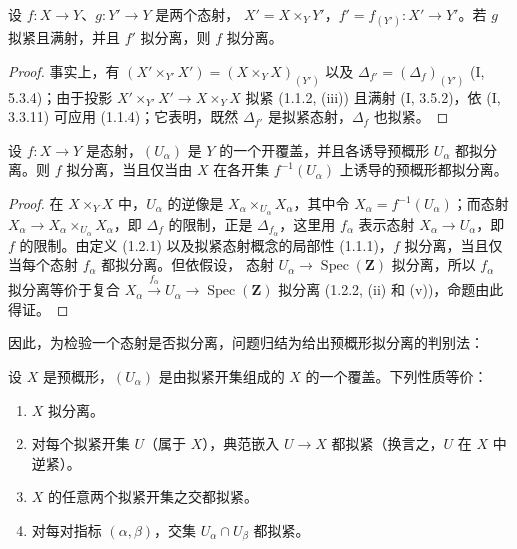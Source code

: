 \begin{proposition}[1.2.5]
\label{IV.1.2.5-fr}
设 $f:X\to Y$、$g:Y'\to Y$ 是两个态射，
$X'=X\times_Y Y'$，$f'=f_{(Y')}:X'\to Y'$。若 $g$ 拟紧且满射，并且
$f'$ 拟分离，则 $f$ 拟分离。
\end{proposition}

\begin{proof}
事实上，有 $(X'\times_{Y'}X')=(X\times_YX)_{(Y')}$ 以及
$\Delta_{f'}=(\Delta_f)_{(Y')}$ (I, 5.3.4)；由于投影
$X'\times_{Y'}X'\to X\times_YX$ 拟紧 (1.1.2, (iii)) 且满射
(I, 3.5.2)，依 (I, 3.3.11) 可应用 (1.1.4)；它表明，既然
$\Delta_{f'}$ 是拟紧态射，$\Delta_f$ 也拟紧。
\end{proof}

\begin{proposition}[1.2.6]
\label{IV.1.2.6-fr}
设 $f:X\to Y$ 是态射，$(U_\alpha)$ 是 $Y$ 的一个开覆盖，并且各诱导预概形
$U_\alpha$ 都拟分离。则 $f$ 拟分离，当且仅当由 $X$ 在各开集
$f^{-1}(U_\alpha)$ 上诱导的预概形都拟分离。
\end{proposition}

\begin{proof}
在 $X\times_YX$ 中，$U_\alpha$ 的逆像是
$X_\alpha\times_{U_\alpha}X_\alpha$，其中令
$X_\alpha=f^{-1}(U_\alpha)$；而态射
$X_\alpha\to X_\alpha\times_{U_\alpha}X_\alpha$，即 $\Delta_f$ 的限制，正是
$\Delta_{f_\alpha}$，这里用 $f_\alpha$ 表示态射
$X_\alpha\to U_\alpha$，即 $f$ 的限制。由定义 (1.2.1) 以及拟紧态射概念的局部性
(1.1.1)，$f$ 拟分离，当且仅当每个态射 $f_\alpha$ 都拟分离。但依假设，
态射 $U_\alpha\to\operatorname{Spec}(\mathbf Z)$ 拟分离，所以
$f_\alpha$ 拟分离等价于复合
$X_\alpha\xrightarrow{f_\alpha}U_\alpha\to\operatorname{Spec}(\mathbf Z)$
拟分离 (1.2.2, (ii) 和 (v))，命题由此得证。
\end{proof}


因此，为检验一个态射是否拟分离，问题归结为给出预概形拟分离的判别法：

\begin{proposition}[1.2.7]
\label{IV.1.2.7-fr}
设 $X$ 是预概形，$(U_\alpha)$ 是由拟紧开集组成的 $X$ 的一个覆盖。下列性质等价：
\begin{enumerate}
  \item[a)] $X$ 拟分离。
  \item[b)] 对每个拟紧开集 $U$（属于 $X$），典范嵌入
  $U\to X$ 都拟紧（换言之，$U$ 在 $X$ 中逆紧）。
  \item[b')] $X$ 的任意两个拟紧开集之交都拟紧。
  \item[c)] 对每对指标 $(\alpha,\beta)$，交集
  $U_\alpha\cap U_\beta$ 都拟紧。
\end{enumerate}
\end{proposition}

